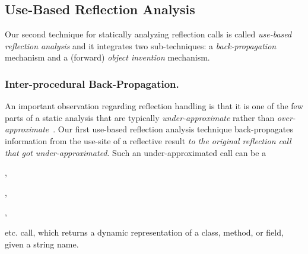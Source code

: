 
\subsection{Use-Based Reflection Analysis}
\label{sec:use-based}

Our second technique for statically analyzing reflection calls
is called \emph{use-based reflection
  analysis} and it integrates two sub-techniques: a
\emph{back-propagation} mechanism and a (forward) \emph{object invention}
mechanism. 

\subsubsection{Inter-procedural Back-Propagation.}
\label{sec:back-propagation}

An important observation regarding reflection handling is that it is
one of the few parts of a static analysis that are typically
\emph{under-approximate} rather than \emph{over-approximate}~\cite{soundiness15}.
%
Our first use-based reflection analysis technique back-propagates
information from the use-site of a reflective result \emph{to the
  original reflection call that got under-approximated}. Such an
under-approximated call can be a
\begin{inparablank}
\item {},
\item {},
\item {},
\end{inparablank}
etc. call, which returns a dynamic representation of a class, method,
or field, given a string name.

